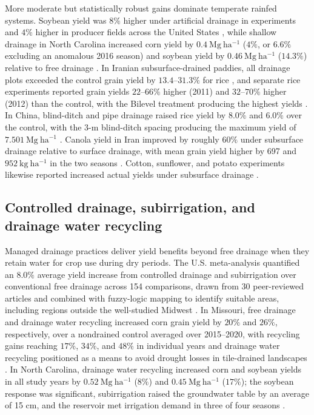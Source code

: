 More moderate but statistically robust gains dominate temperate rainfed systems. Soybean yield was \(8\%\) higher under artificial drainage in experiments and \(4\%\) higher in producer fields across the United States \parencite{Mourtzinis2021}, while shallow drainage in North Carolina increased corn yield by \(0.4\ \mathrm{Mg\ ha^{-1}}\) (\(4\%\), or \(6.6\%\) excluding an anomalous 2016 season) and soybean yield by \(0.46\ \mathrm{Mg\ ha^{-1}}\) (\(14.3\%\)) relative to free drainage \parencite{Watkins2024}. In Iranian subsurface-drained paddies, all drainage plots exceeded the control grain yield by \(13.4\textrm{--}31.3\%\) for rice \parencite{DarziNaftchali2017b}, and separate rice experiments reported grain yields \(22\textrm{--}66\%\) higher (2011) and \(32\textrm{--}70\%\) higher (2012) than the control, with the Bilevel treatment producing the highest yields \parencite{DarziNaftchali2014}. In China, blind-ditch and pipe drainage raised rice yield by \(8.0\%\) and \(6.0\%\) over the control, with the 3-m blind-ditch spacing producing the maximum yield of \(7.501\ \mathrm{Mg\ ha^{-1}}\) \parencite{Qi2025b}. Canola yield in Iran improved by roughly \(60\%\) under subsurface drainage relative to surface drainage, with mean grain yield higher by 697 and \(952\ \mathrm{kg\ ha^{-1}}\) in the two seasons \parencite{Asgari2021}. Cotton, sunflower, and potato experiments likewise reported increased actual yields under subsurface drainage \parencite{Yang2022,Zhang2024c,SerranoCoronel2018}.

\subsection{Controlled drainage, subirrigation, and drainage water recycling}

Managed drainage practices deliver yield benefits beyond free drainage when they retain water for crop use during dry periods. The U.S. meta-analysis quantified an \(8.0\%\) average yield increase from controlled drainage and subirrigation over conventional free drainage across 154 comparisons, drawn from 30 peer-reviewed articles and combined with fuzzy-logic mapping to identify suitable areas, including regions outside the well-studied Midwest \parencite{Singh2022b}. In Missouri, free drainage and drainage water recycling increased corn grain yield by \(20\%\) and \(26\%\), respectively, over a nondrained control averaged over 2015--2020, with recycling gains reaching \(17\%\), \(34\%\), and \(48\%\) in individual years and drainage water recycling positioned as a means to avoid drought losses in tile-drained landscapes \parencite{Kaur2021}. In North Carolina, drainage water recycling increased corn and soybean yields in all study years by \(0.52\ \mathrm{Mg\ ha^{-1}}\) (\(8\%\)) and \(0.45\ \mathrm{Mg\ ha^{-1}}\) (\(17\%\)); the soybean response was significant, subirrigation raised the groundwater table by an average of 15 cm, and the reservoir met irrigation demand in three of four seasons \parencite{Moursi2024}.


